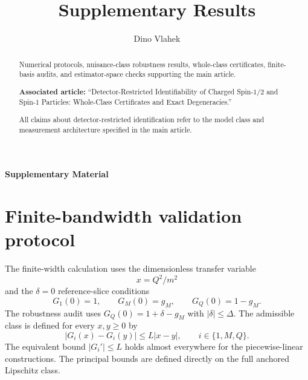 \documentclass[12pt]{iopjournal}
\renewcommand{\articletype}[1]{\par\noindent\textsf{\textbf{#1}}\par\medskip}
\begin{document}
\articletype{Supplementary Material}
\title{Supplementary Results}
\author{Dino Vlahek}\par
{}
\par{}\par

\begin{abstract}
Numerical protocols, nuisance-class robustness results, whole-class certificates, finite-basis audits, and estimator-space checks supporting the main article.\par
\medskip
\noindent\textbf{Associated article:} ``Detector-Restricted Identifiability of Charged Spin-$1/2$ and Spin-$1$ Particles: Whole-Class Certificates and Exact Degeneracies.''\par
\medskip
All claims about detector-restricted identification refer to the model class and measurement architecture specified in the main article.
\end{abstract}

\section{Finite-bandwidth validation protocol}

The finite-width calculation uses the dimensionless transfer variable
\begin{equation}
x=Q^2/m^2
\end{equation}
and the $\delta=0$ reference-slice conditions
\begin{equation}
G_1(0)=1,\qquad G_M(0)=g_M,\qquad G_Q(0)=1-g_M.
\end{equation}
The robustness audit uses $G_Q(0)=1+\delta-g_M$ with $|\delta|\le\Delta$.
The admissible class is defined for every $x,y\ge0$ by
\begin{equation}
|G_i(x)-G_i(y)|\le L|x-y|,
\qquad i\in\{1,M,Q\}.
\end{equation}
The equivalent bound $|G_i'|\le L$ holds almost everywhere for the piecewise-linear constructions. The principal bounds are defined directly on the full anchored Lipschitz class.
\end{document}
